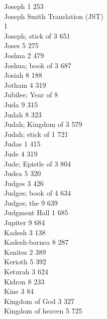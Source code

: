 Joseph \hfill 1 \quad \phantom{0}253\\
Joseph Smith Translation (JST) \\ \mbox{} \hfill 1 \\
Joseph; stick of \hfill 3 \quad \phantom{0}651\\
Joses \hfill 5 \quad \phantom{0}275\\
Joshua \hfill 2 \quad \phantom{0}479\\
Joshua; book of \hfill 3 \quad \phantom{0}687\\
Josiah \hfill 8 \quad \phantom{0}188\\
Jotham \hfill 4 \quad \phantom{0}319\\
Jubilee; Year of \hfill 8 \\
Juda \hfill 9 \quad \phantom{0}315\\
Judah \hfill 8 \quad \phantom{0}323\\
Judah; Kingdom of \hfill 3 \quad \phantom{0}579\\
Judah; stick of \hfill 1 \quad \phantom{0}721\\
Judas \hfill 1 \quad \phantom{0}415\\
Jude \hfill 4 \quad \phantom{0}319\\
Jude; Epistle of \hfill 3 \quad \phantom{0}804\\
Judea \hfill 5 \quad \phantom{0}320\\
Judges \hfill 3 \quad \phantom{0}426\\
Judges; book of \hfill 4 \quad \phantom{0}634\\
Judges; the \hfill 9 \quad \phantom{0}639\\
Judgment Hall \hfill 1 \quad \phantom{0}685\\
Jupiter \hfill 9 \quad \phantom{0}684\\
Kadesh \hfill 3 \quad \phantom{0}138\\
Kadesh-barnea \hfill 8 \quad \phantom{0}287\\
Kenites \hfill 2 \quad \phantom{0}389\\
Kerioth \hfill 5 \quad \phantom{0}392\\
Keturah \hfill 3 \quad \phantom{0}624\\
Kidron \hfill 8 \quad \phantom{0}233\\
Kine \hfill 3 \quad \phantom{0}\phantom{0}84\\
Kingdom of God \hfill 3 \quad \phantom{0}327\\
Kingdom of heaven \hfill 5 \quad \phantom{0}725\\
